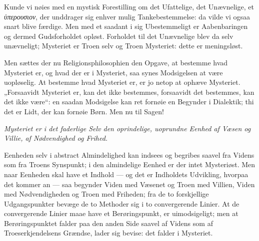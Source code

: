 \documentclass[12pt]{book}
\begin{document}
Kunde vi nøies med en mystisk Forestilling om det Ufattelige, det
Unævnelige, et \textit{ὑπερουσιον}, der unddrager sig enhver mulig
Tankebestemmelse: da vilde vi ogsaa snart blive færdige. Men med et
saadant i sig Ubestemmeligt er Aabenbaringen og dermed
Gudsforholdet opløst. Forholdet til det Unævnelige blev da selv
unævneligt; Mysteriet er Troen selv og Troen Mysteriet: dette er
meningsløst.

Men sættes der nu Religionsphilosophien den Opgave, at bestemme hvad
Mysteriet er, og hvad der er i Mysteriet, saa synes Modsigelsen at
være uopløselig. At bestemme hvad Mysteriet er, er jo netop at
ophæve Mysteriet. „Forsaavidt Mysteriet er, kan det ikke bestemmes,
forsaavidt det bestemmes, kan det ikke være“: en saadan Modsigelse
kan ret fornøie en Begynder i Dialektik; thi det er Lidt, der kan
fornøie Børn. Men nu til Sagen!

\emph{Mysteriet er i det faderlige Selv den oprindelige, uoprundne
Eenhed af Væsen og Villie, af Nødvendighed og Frihed.}

Eenheden selv i abstract Almindelighed kan indsees og begribes
saavel fra Videns som fra Troens Synspunkt; i den almindelige Eenhed
er der intet Mysteriøst. Men naar Eenheden skal have et Indhold ---
og det er Indholdets Udvikling, hvorpaa det kommer an --- saa
begynder Viden med Væsenet og Troen med Villien, Viden med
Nødvendigheden og Troen med Friheden; fra de to forskjellige
Udgangspunkter bevæge de to Methoder sig i to convergerende Linier.
At de convergerende Linier maae
have et Berøringspunkt, er uimodsigeligt; men at Berøringspunktet
falder paa den anden Side saavel af Videns som af
Troeserkjendelsens Grændse, lader sig bevise: det falder i Mysteriet.
\end{document}
